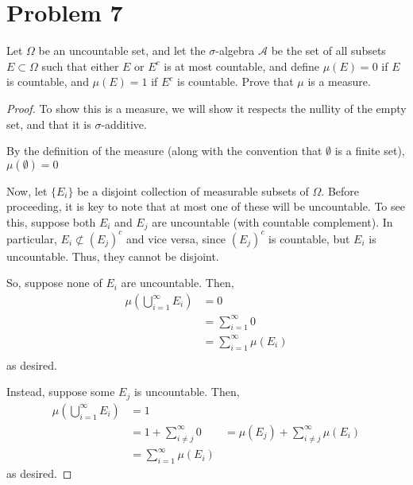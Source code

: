 \documentclass[fontsize=11pt]{scrartcl} %
\numberwithin{equation}{section} %
\numberwithin{figure}{section} %
\numberwithin{table}{section} %
\newcommand{\A}{\mathscr{A}}
\begin{document}
\section*{Problem 7}
Let $\Omega$ be an uncountable set, and let the $\sigma$-algebra $\A$ be the set of all
subsets $E\subset\Omega$ such that either $E$ or $E^c$ is at most countable, and define
$\mu(E) = 0$ if $E$ is countable, and $\mu(E) = 1$ if $E^c$ is countable. Prove that $\mu$
is a measure.
\\
\begin{proof}
To show this is a measure, we will show it respects the nullity of the empty set, and that
it is $\sigma$-additive.

By the definition of the measure (along with the convention that $\emptyset$ is a finite
set), $\mu(\emptyset) = 0$

Now, let $\{E_i\}$ be a disjoint collection of measurable subsets of $\Omega$. Before
proceeding, it is key to note that at most one of these will be uncountable. To see this,
suppose both $E_i$ and $E_j$ are uncountable (with countable complement). In particular,
$E_i\not\subset (E_j)^c$ and vice versa, since $(E_j)^c$ is countable, but $E_i$ is
uncountable. Thus, they cannot be disjoint.

So, suppose none of $E_i$ are uncountable. Then,
\[
\begin{aligned}
\mu\left(\bigcup_{i=1}^{\infty} E_i\right)  &= 0\\
                                            &= \sum_{i=1}^{\infty} 0\\
                                            &= \sum_{i=1}^{\infty} \mu(E_i)\\
\end{aligned}
\]
as desired.

Instead, suppose some $E_j$ is uncountable. Then,
\[
\begin{aligned}
\mu\left(\bigcup_{i=1}^{\infty} E_i\right)  &= 1\\
                                            &= 1 + \sum_{i\neq j}^{\infty} 0
                                            &= \mu(E_j) + \sum_{i\neq j}^{\infty} \mu(E_i)\\
                                            &= \sum_{i=1}^{\infty} \mu(E_i)
\end{aligned}
\]
as desired.

\end{proof}
\end{document}
